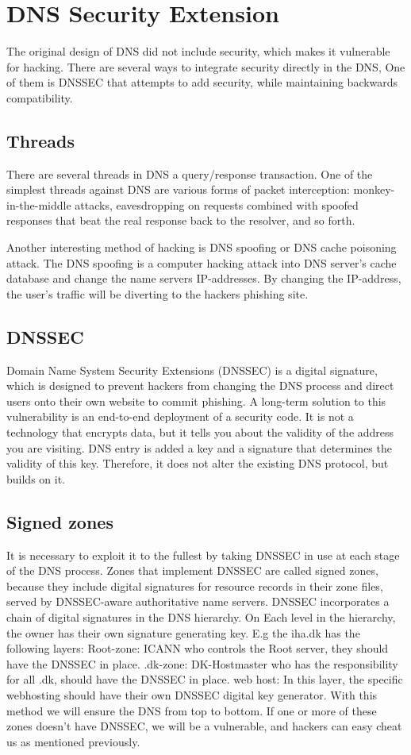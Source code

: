 
\section{DNS Security Extension}
\label{DNS Security Extensions}
The original design of DNS did not include security, which makes it vulnerable for hacking.
There are several ways to integrate security directly in the DNS, One of them is DNSSEC that attempts to add security, while maintaining backwards compatibility.

\subsection{Threads}
There are several threads in DNS a query/response transaction.
One of the simplest threads against DNS are various forms of packet interception: monkey-in-the-middle attacks, eavesdropping on requests combined with spoofed responses that beat the real response back to the resolver, and so forth.

Another interesting method of hacking is DNS spoofing or DNS cache poisoning attack.
The DNS spoofing is a computer hacking attack into DNS server's cache database and change the name servers IP-addresses. By changing the IP-address, the user's traffic will be diverting to the hackers phishing site.

\subsection{DNSSEC}
Domain Name System Security Extensions (DNSSEC) is a digital signature, which is designed to prevent hackers from changing the DNS process and direct users onto their own website to commit phishing. A long-term solution to this vulnerability is an end-to-end deployment of a security code. It is not a technology that encrypts data, but it tells you about the validity of the address you are visiting. DNS entry is added a key and a signature that determines the validity of this key. Therefore, it does not alter the existing DNS protocol, but builds on it.

\subsection{Signed zones}
It is necessary to exploit it to the fullest by taking DNSSEC in use at each stage of the DNS process.
Zones that implement DNSSEC are called signed zones, because they include digital signatures for resource records in their zone files,
served by DNSSEC-aware authoritative name servers.
DNSSEC incorporates a chain of digital signatures in the DNS hierarchy. On Each level in the hierarchy, the owner has their own signature generating key. 
E.g the iha.dk has the following layers:
Root-zone: ICANN who controls the Root server, they should have the DNSSEC in place.
.dk-zone: DK-Hostmaster who has the responsibility for all .dk, should have the DNSSEC in place.
web host: In this layer, the specific webhosting should have their own DNSSEC digital key generator.
With this method we will ensure the DNS from top to bottom.
If one or more of these zones doesn't have DNSSEC, we will be a vulnerable, and hackers can easy cheat us as mentioned previously.